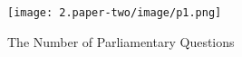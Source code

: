 \begin{figure}[htbp]
    \centering
    \texttt{[image: 2.paper-two/image/p1.png]}
    \caption{The Number of Parliamentary Questions}
    \label{fig:top30}
    \begin{tablenotes}
    \end{tablenotes}
\end{figure}